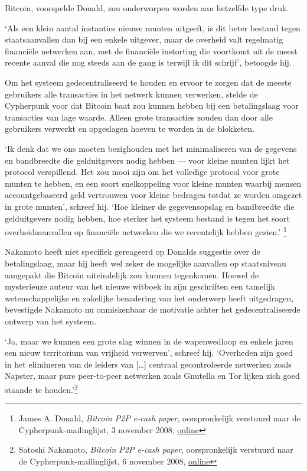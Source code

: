 \documentclass[
  a5paper,
  smalldemyvopaper,11pt,twoside,onecolumn,openright,extrafontsizes,
hidelinks]{memoir}
\begin{document}
Bitcoin, voorspelde Donald, zou onderworpen worden aan hetzelfde type
druk.

`Als een klein aantal instanties nieuwe munten uitgeeft, is dit beter
bestand tegen staatsaanvallen dan bij een enkele uitgever, maar de
overheid valt regelmatig financiële netwerken aan, met de financiële
instorting die voortkomt uit de meest recente aanval die nog steeds aan
de gang is terwijl ik dit schrijf', betoogde hij.

Om het systeem gedecentraliseerd te houden en ervoor te zorgen dat de
meeste gebruikers alle transacties in het netwerk kunnen verwerken,
stelde de Cypherpunk voor dat Bitcoin baat zou kunnen hebben bij een
betalingslaag voor transacties van lage waarde. Alleen grote transacties
zouden dan door alle gebruikers verwerkt en opgeslagen hoeven te worden
in de blokketen.

`Ik denk dat we ons moeten bezighouden met het minimaliseren van de
gegevens en bandbreedte die gelduitgevers nodig hebben --- voor kleine
munten lijkt het protocol verspillend. Het zou mooi zijn om het
volledige protocol voor grote munten te hebben, en een soort
snelkoppeling voor kleine munten waarbij mensen accountgebaseerd geld
vertrouwen voor kleine bedragen totdat ze worden omgezet in grote
munten', schreef hij. `Hoe kleiner de gegevensopslag en bandbreedte die
gelduitgevers nodig hebben, hoe sterker het systeem bestand is tegen het
soort overheidsaanvallen op financiële netwerken die we recentelijk
hebben gezien.' \footnote{James A. Donald, \emph{Bitcoin P2P e-cash
  paper}, oorspronkelijk verstuurd naar de Cypherpunk-mailinglijst, 3
  november 2008,
  \href{https://www.metzdowd.com/pipermail/cryptography/2008-November/014819.html}{online}}

Nakamoto heeft niet specifiek gereageerd op Donalds suggestie over de
betalingslaag, maar hij heeft wel zeker de mogelijke aanvallen op
staatsniveau aangepakt die Bitcoin uiteindelijk zou kunnen tegenkomen.
Hoewel de mysterieuze auteur van het nieuwe witboek in zijn geschriften
een tamelijk wetenschappelijke en zakelijke benadering van het onderwerp
heeft uitgedragen, bevestigde Nakamoto nu onmiskenbaar de motivatie
achter het gedecentraliseerde ontwerp van het systeem.

`Ja, maar we kunnen een grote slag winnen in de wapenwedloop en enkele
jaren een nieuw territorium van vrijheid verwerven', schreef hij.
`Overheden zijn goed in het elimineren van de leiders van {[}\ldots{]}
centraal gecontroleerde netwerken zoals Napster, maar pure peer-to-peer
netwerken zoals Gnutella en Tor lijken zich goed staande te
houden.'\footnote{Satoshi Nakamoto, \emph{Bitcoin P2P e-cash paper},
  oorspronkelijk verstuurd naar de Cypherpunk-mailinglijst, 6 november
  2008,
  \href{https://www.metzdowd.com/pipermail/cryptography/2008-November/014823.html}{online}}
\end{document}
